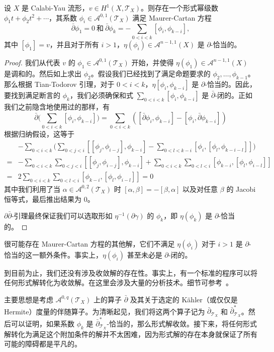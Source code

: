 \begin{proposition}
    设 $X$ 是 Calabi-Yau 流形，$v\in H^1(X,\mathcal{T}_X)$。则存在一个形式幂级数 $\phi_1 t+\phi_2 t^2+\cdots$，其系数 $\phi_i\in\mathcal{A}^{0,1}(\mathcal{T}_X)$ 满足 Maurer-Cartan 方程\[
        \bar{\partial}\phi_1=0\ \text{和}\ \bar{\partial}\phi_k=-\sum_{0<i<k}[\phi_i,\phi_{k-i}],
    \]其中 $[\phi_1]=v$，并且对于所有 $i>1$，$\eta(\phi_i)\in\mathcal{A}^{n-1,1}(X)$ 是 $\partial$-恰当的。
\end{proposition}

\begin{proof}
    我们从代表 $v$ 的 $\phi_1\in\mathcal{A}^{0,1}(\mathcal{T}_X)$ 开始，并使得 $\eta(\phi_1)\in\mathcal{A}^{n-1,1}(X)$ 是调和的。然后如上求出 $\phi_2$。假设我们已经找到了满足命题要求的 $\phi_2,\dots,\phi_{k-1}$。那么根据 Tian-Todorov 引理，对于 $0<i<k$，$\eta[\phi_i,\phi_{k-i}]$ 是 $\partial$-恰当的。因此，要找到满足断言的 $\phi_k$，我们必须确保和式 $\sum_{0<i<k}[\phi_i,\phi_{k-i}]$ 是 $\bar{\partial}$-闭的。正如我们之前隐含地使用过的那样，有\[
        \bar{\partial}\bigg(\sum_{0<i<k}[\phi_i,\phi_{k-i}]\bigg)=\sum_{0<i<k}([\bar{\partial}\phi_i,\phi_{k-i}]-[\phi_{i},\bar{\partial}\phi_{k-i}])
    \]根据归纳假设，这等于\begin{align*}
        & -\sum_{0<i<k}\bigg(\sum_{0<j<i}[[\phi_j,\phi_{i-j}],\phi_{k-i}]-\sum_{0<l<k-i}[\phi_i,[\phi_l,\phi_{k-i-l}]]\bigg)\\
        =&-\sum_{0<i<k}\sum_{0<j<i}[[\phi_j,\phi_{i-j}],\phi_{k-i}]+\sum_{0<i<k}\sum_{0<l<i}[\phi_{k-i},[\phi_l,\phi_{i-l}]]\\
        =&2\sum_{0<i<k}\sum_{0<l<i}[\phi_{k-i},[\phi_l,\phi_{i-l}]]=0
    \end{align*}其中我们利用了当 $\alpha\in\mathcal{A}^{0,2}(\mathcal{T}_X)$ 时 $[\alpha,\beta]=-[\beta,\alpha]$ 以及对任意 $\beta$ 的 Jacobi 恒等式，最后推出结果为 0。

    $\partial\bar{\partial}$-引理最终保证我们可以选取形如 $\eta^{-1}(\partial\gamma)$ 的 $\phi_k$，即 $\eta(\phi_k)$ 是 $\partial$-恰当的。
\end{proof}

\begin{remark}
    很可能存在 Maurer-Cartan 方程的其他解，它们不满足 $\eta(\phi_i)$ 对于 $i>1$ 是 $\partial$-恰当的这一额外条件。事实上，$\eta(\phi_i)$ 甚至未必是 $\partial$-闭的。
\end{remark}

\begin{remark}
    到目前为止，我们还没有涉及收敛解的存在性。事实上，有一个标准的程序可以将任何形式解转化为收敛解。在这里会涉及大量的分析技术。细节可参考~\cite[Sect. 5.3]{Kodaira}。

    主要思想是考虑 $\mathcal{A}^{0,q}(\mathcal{T}_X)$ 上的算子 $\bar{\partial}$ 及其关于选定的 Kähler（或仅仅是 Hermite）度量的伴随算子。为清晰起见，我们将这两个算子记为 $\bar{\partial}_{\mathcal{T}_X}$ 和 $\bar{\partial}^*_{\mathcal{T}_X}$。然后可以证明，如果系数 $\phi_k$ 是 $\bar{\partial}^*_{\mathcal{T}_X}$-恰当的，那么形式解收敛。接下来，将任何形式解转化为满足这个附加条件的解并不太困难，因为形式解的存在本身就保证了所有可能的障碍都是平凡的。
\end{remark}